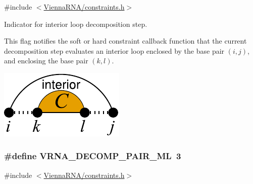 {\ttfamily \#include $<$\hyperlink{constraints_8h}{Vienna\+R\+N\+A/constraints.\+h}$>$}



Indicator for interior loop decomposition step. 

This flag notifies the soft or hard constraint callback function that the current decomposition step evaluates an interior loop enclosed by the base pair $(i,j)$, and enclosing the base pair $(k,l)$.

 
\begin{DoxyImageNoCaption}
  \mbox{\includegraphics[width=\textwidth,height=\textheight/2,keepaspectratio=true]{decomp_il}}
\end{DoxyImageNoCaption}
\subsubsection[{\texorpdfstring{V\+R\+N\+A\+\_\+\+D\+E\+C\+O\+M\+P\+\_\+\+P\+A\+I\+R\+\_\+\+ML}{VRNA_DECOMP_PAIR_ML}}]{\setlength{\rightskip}{0pt plus 5cm}\#define V\+R\+N\+A\+\_\+\+D\+E\+C\+O\+M\+P\+\_\+\+P\+A\+I\+R\+\_\+\+ML~3}\hypertarget{group__constraints_gaa15b1185673f0b9e900c4748d45f388f}{}\label{group__constraints_gaa15b1185673f0b9e900c4748d45f388f}


{\ttfamily \#include $<$\hyperlink{constraints_8h}{Vienna\+R\+N\+A/constraints.\+h}$>$}



